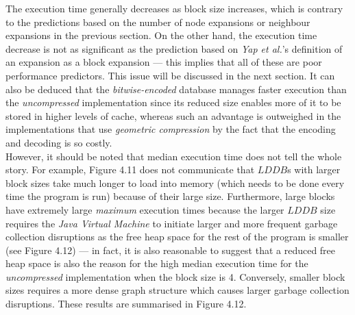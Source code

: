 \documentclass[12pt,notitlepage]{report}
\begin{document}
\noindent
The execution time generally decreases as block size increases, which is contrary to the predictions based on the number of  node expansions or neighbour expansions in the previous section. On the other hand, the execution time decrease is not as significant as the prediction based on {\em Yap et al.}'s definition of an expansion as a block expansion --- this implies that all of these are poor performance predictors. This issue will be discussed in the next section.
\noindent 
It can also be deduced that the {\em bitwise-encoded} database manages faster execution than the {\em uncompressed} implementation since its reduced size enables more of it to be stored in higher levels of cache, whereas such an advantage is outweighed in the implementations that use {\em geometric compression} by the fact that the encoding and decoding is so costly.\\

\noindent
However, it should be noted that median execution time does not tell the whole story. For example, Figure 4.11 does not communicate that $LDDB$s with larger block sizes take much longer to load into memory (which needs to be done every time the program is run) because of their large size. Furthermore, large blocks have extremely large {\em maximum} execution times because the larger $LDDB$ size requires the {\em Java Virtual Machine} to initiate larger and more frequent garbage collection disruptions as the free heap space for the rest of the program is smaller (see Figure 4.12) --- in fact, it is also reasonable to suggest that a reduced free heap space is also the reason for the high median execution time for the {\em uncompressed} implementation when the block size is 4. Conversely, smaller block sizes requires a more dense graph structure which causes larger garbage collection disruptions. These results are summarised in Figure 4.12.\\
\end{document}
